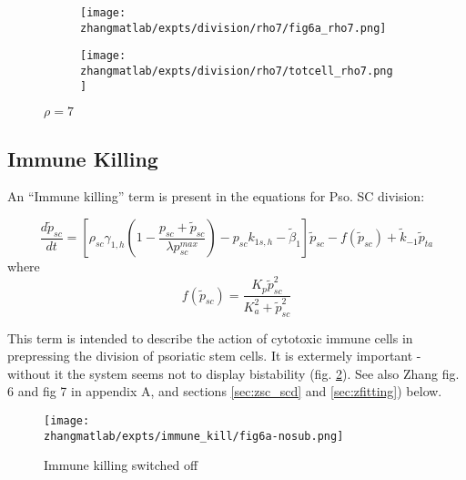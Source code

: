 \documentclass[a4paper,10pt]{report}
\newcommand{\psortbase}{/home/ngrs2/work/bsu/PSORT_Zuliani_Reynolds/}
\newcommand{\zhangmatlab}{\psortbase/zhang_model}
\begin{document}
\begin{figure}[h!]
  \begin{subfigure}{.5\textwidth}
    \centering
    \texttt{[image: \\zhangmatlab/expts/division/rho7/fig6a\_rho7.png]}
  \end{subfigure}
  \begin{subfigure}{.5\textwidth}
    \centering
    \texttt{[image: \\zhangmatlab/expts/division/rho7/totcell\_rho7.png]}
  \end{subfigure}
  \caption{$\rho=7$}
  \label{fig:rho7}
\end{figure}







\subsection{Immune Killing}


An “Immune killing” term is present in the equations for Pso. SC division:

\[
\frac{d\tilde{p}_{sc}}{dt} = \left [ \rho_{sc}\gamma_{1,h}\left ( 
1-\frac{p_{sc} + \tilde{p}_{sc}}{\lambda p_{sc}^{max}} \right ) - 
p_{sc} k_{1s,h} - \tilde{\beta}_1 \right ] \tilde{p}_{sc} 
- f(\tilde{p}_{sc}) + \tilde{k}_{-1}\tilde{p}_{ta}
\]
where 
\[
f(\tilde{p}_{sc}) = \frac{K_p \tilde{p}_{sc}^2}{K_a^2 + \tilde{p}_{sc}^2}
\]

This term is intended to describe the action of cytotoxic immune cells in prepressing the division of psoriatic stem cells. It is extermely important - without it the system seems not to display bistability (fig. \ref{fig:noimmkilling}). See also Zhang fig. 6 and fig 7 in appendix A, and sections \ref{sec:zsc_scd} and \ref{sec:zfitting}) below.

\begin{figure}[h!]
    \texttt{[image: \\zhangmatlab/expts/immune\_kill/fig6a-nosub.png]}
  \caption{Immune killing switched off}
  \label{fig:noimmkilling}
\end{figure}
\end{document}
